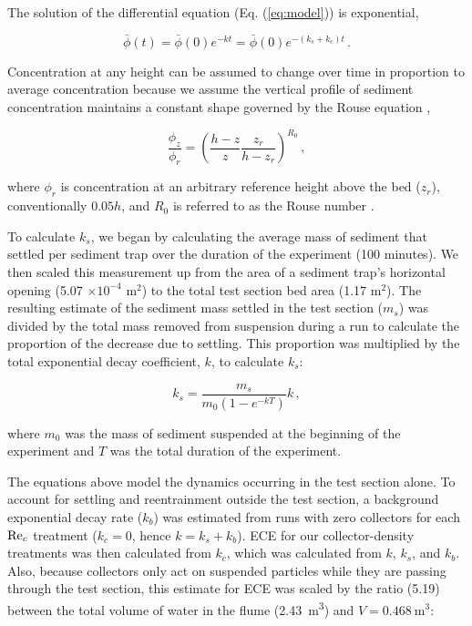 \documentclass[geosciences,article,submit,moreauthors,pdftex]{Definitions/mdpi}
\begin{document}
The solution of the differential equation (Eq. (\ref{eq:model})) is exponential,

\begin{equation}
    \bar{\phi}(t) = \bar{\phi}(0)e^{-kt} = \bar{\phi}(0)e^{-(k_s + k_c)t}\,.
    \label{eq:expo}    
\end{equation}

\noindent Concentration at any height can be assumed to change over time in proportion to average concentration because we assume the vertical profile of sediment concentration maintains a constant shape governed by the Rouse equation \cite{rouse1937modern},

\begin{equation}
    \frac{\phi_z}{\phi_r} = \left( \frac{h - z}{z} \frac{z_r}{h - z_r} \right)^{R_0}\,,
    \label{eq:rouse}    
\end{equation}

\noindent where $\phi_r$ is concentration at an arbitrary reference height above the bed ($z_r$), conventionally $0.05h$, and $R_0$ is referred to as the Rouse number \cite{kumbhakar2017derivation}.

To calculate $k_s$, we began by calculating the average mass of sediment that settled per sediment trap over the duration of the experiment (100 minutes). We then scaled this measurement up from the area of a sediment trap's horizontal opening (5.07 $\times 10^{-4}$ m$^2$) to the total test section bed area (1.17 m$^2$). The resulting estimate of the sediment mass settled in the test section ($m_s$) was divided by the total mass removed from suspension during a run to calculate the proportion of the decrease due to settling. This proportion was multiplied by the total exponential decay coefficient, $k$, to calculate $k_s$:

\begin{equation}
    k_s = \frac{m_s}{m_0(1-e^{-kT})}k\,,
    \label{eq:ks}
\end{equation}

\noindent where $m_0$ was the mass of sediment suspended at the beginning of the experiment and $T$ was the total duration of the experiment.

The equations above model the dynamics occurring in the test section alone. To account for settling and reentrainment outside the test section, a background exponential decay rate ($k_b$) was estimated from runs with zero collectors for each $\mathrm{Re}_c$ treatment ($k_c = 0$, hence $k = k_s + k_b$). ECE for our collector-density treatments was then calculated from $k_c$, which was calculated from $k$, $k_s$, and $k_b$. Also, because collectors only act on suspended particles while they are passing through the test section, this estimate for ECE was scaled by the ratio (5.19) between the total volume of water in the flume (\SI{2.43}{\metre\cubed}) and $V = \SI{0.468}{\metre\cubed}$:
\end{document}
